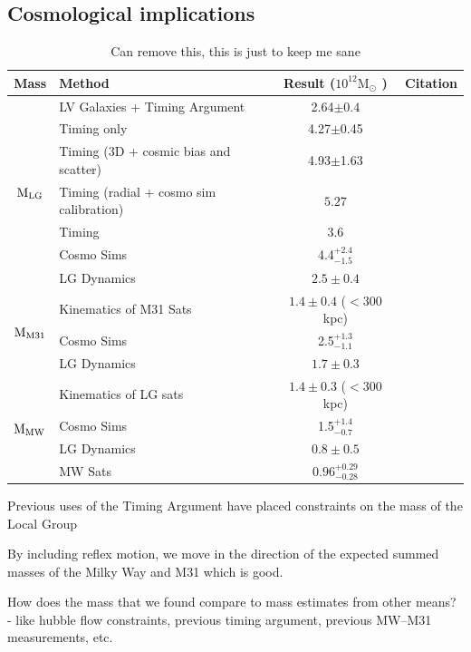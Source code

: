 \documentclass[twocolumn]{aastex631}
\newcommand{\mlg}{\ensuremath{\textrm{M}_{\rm LG}}}
\newcommand{\mmto}{\ensuremath{\textrm{M}_{\rm M31}}}
\newcommand{\mmw}{\ensuremath{\textrm{M}_{\rm MW}}}
\newcommand{\msun}{\ensuremath{\textrm{M}_{\odot}}}
\begin{document}
\subsection{Cosmological implications}
\begin{table}
  \centering
  \begin{tabular}{clc|c}
    \hline\hline
    Mass & Method & Result ($ 10^{12}\msun$ ) & Citation \\\hline
    \multirow{7}{*}{\mlg}  &{LV Galaxies + Timing Argument} & {2.64$\pm0.4$} & \cite{Penarrubia2016} \\
    &{Timing only} & {4.27$\pm$0.45} & \cite{vdm2012} \\
    &{Timing (3D + cosmic bias and scatter)} & {4.93$\pm$1.63} & \cite{vdm2012} \\
    &Timing (radial + cosmo sim calibration)  & $5.27$& \cite{LiWhite2008} \\
    &Timing & $3.6$ & \cite{Lynden-Bell:1981} \\
    & Cosmo Sims & 4.4$^{+2.4}_{-1.5}$ & \cite{Zhai2020}\\
    & LG Dynamics &$2.5\pm0.4$ & \cite{Diaz2014}\\
    \hline
    \multirow{3}{*}{\mmto}& Kinematics of M31 Sats & $1.4 \pm 0.4$ ($<$300 kpc) & \cite{Watkins2010}\\
    & Cosmo Sims & 2.5$^{+1.3}_{-1.1}$ & \cite{Zhai2020}\\
    & LG Dynamics &$1.7\pm0.3$ & \cite{Diaz2014}\\
    \hline
    \multirow{4}{*}{\mmw}&  Kinematics of LG sats & $1.4 \pm 0.3$ ($<$300 kpc) & \cite{Watkins2010}\\
    & Cosmo Sims & 1.5$^{+1.4}_{-0.7}$ & \cite{Zhai2020} \\
    & LG Dynamics &$0.8\pm0.5$ & \cite{Diaz2014}\\
    & MW Sats & $0.96^{+0.29}_{-0.28}$ & \cite{Patel2017}\\
  \hline\hline
  \end{tabular}
  \caption{\label{table:masses}Can remove this, this is just to keep me sane}
\end{table}
Previous uses of the Timing Argument have placed constraints on the mass of the Local Group

By including reflex motion, we move in the direction of the expected summed masses of the Milky Way and M31 which is good.

How does the mass that we found compare to mass estimates from other means?
- like hubble flow constraints, previous timing argument, previous MW--M31 measurements, etc.
\end{document}
